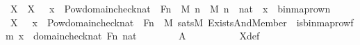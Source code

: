 \begin{isabellebody}
\ X\ \ {\isachardoublequoteopen}X\ {\isasymequiv}\ {\isacharbraceleft}{\kern0pt}\ x\ {\isasymin}\ Pow{\isacharparenleft}{\kern0pt}domain{\isacharparenleft}{\kern0pt}check{\isacharparenleft}{\kern0pt}nat{\isacharparenright}{\kern0pt}{\isacharparenright}{\kern0pt}\ {\isasymtimes}\ Fn{\isacharparenright}{\kern0pt}\ {\isasyminter}\ M{\isachardot}{\kern0pt}\ {\isasymexists}n\ {\isasymin}\ M{\isachardot}{\kern0pt}\ n\ {\isasymin}\ nat\ {\isasymand}\ x\ {\isacharequal}{\kern0pt}\ binmap{\isacharunderscore}{\kern0pt}row{\isacharprime}{\kern0pt}{\isacharparenleft}{\kern0pt}n{\isacharparenright}{\kern0pt}\ {\isacharbraceright}{\kern0pt}{\isachardoublequoteclose}\ \isanewline
\isanewline
\ \ \isamarkupfalse%
\ {\isachardoublequoteopen}X\ {\isacharequal}{\kern0pt}\ {\isacharbraceleft}{\kern0pt}\ x\ {\isasymin}\ Pow{\isacharparenleft}{\kern0pt}domain{\isacharparenleft}{\kern0pt}check{\isacharparenleft}{\kern0pt}nat{\isacharparenright}{\kern0pt}{\isacharparenright}{\kern0pt}\ {\isasymtimes}\ Fn{\isacharparenright}{\kern0pt}\ {\isasyminter}\ M{\isachardot}{\kern0pt}\ sats{\isacharparenleft}{\kern0pt}M{\isacharcomma}{\kern0pt}\ Exists{\isacharparenleft}{\kern0pt}And{\isacharparenleft}{\kern0pt}Member{\isacharparenleft}{\kern0pt}{}{\isacharcomma}{\kern0pt}\ {}{\isacharparenright}{\kern0pt}{\isacharcomma}{\kern0pt}\ is{\isacharunderscore}{\kern0pt}binmap{\isacharunderscore}{\kern0pt}row{\isacharprime}{\kern0pt}{\isacharunderscore}{\kern0pt}fm{\isacharparenleft}{\kern0pt}{}{\isacharcomma}{\kern0pt}{}{\isacharcomma}{\kern0pt}{}{\isacharcomma}{\kern0pt}{}{\isacharcomma}{\kern0pt}{}{\isacharparenright}{\kern0pt}{\isacharparenright}{\kern0pt}{\isacharparenright}{\kern0pt}{\isacharcomma}{\kern0pt}\ {\isacharbrackleft}{\kern0pt}x{\isacharbrackright}{\kern0pt}\ {\isacharat}{\kern0pt}\ {\isacharbrackleft}{\kern0pt}domain{\isacharparenleft}{\kern0pt}check{\isacharparenleft}{\kern0pt}nat{\isacharparenright}{\kern0pt}{\isacharparenright}{\kern0pt}{\isacharcomma}{\kern0pt}\ Fn{\isacharcomma}{\kern0pt}\ nat{\isacharbrackright}{\kern0pt}{\isacharparenright}{\kern0pt}\ {\isacharbraceright}{\kern0pt}{\isachardoublequoteclose}\isanewline
\ \ \ \ {\isacharparenleft}{\kern0pt}\ {\isachardoublequoteopen}{\isacharunderscore}{\kern0pt}\ {\isacharequal}{\kern0pt}\ {\isacharquery}{\kern0pt}A{\isachardoublequoteclose}{\isacharparenright}{\kern0pt}\isanewline
\ \ \ \ \isanewline
\ \ \ \ \isamarkupfalse%
\ X{\isacharunderscore}{\kern0pt}def\isanewline

\end{isabellebody}
